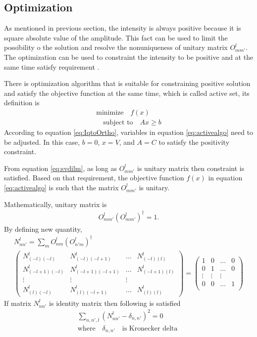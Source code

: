 \subsection{Optimization}
As mentioned in previous section, the intensity is always positive because it is square absolute value of the amplitude. This fact can be used to limit the possibility o the solution and resolve the nonuniqueness of unitary matrix $O^{l}_{mm'}$. The optimization can be used to constraint the intensity to be positive and at the same time satisfy requirement \Blq. 

There is optimization algorithm that is suitable for constraining positive solution and satisfy the objective function at the same time, which is called active set, its definition is
\begin{eqnarray}
\mbox{minimize}\quad f(x) \\ \nonumber
\quad \mbox{subject to} \quad Ax\geq b
\label{eq:activealgo}
\end{eqnarray}
According to equation \ref{eq:IqtoOrtho}, variables in equation \ref{eq:activealgo} need to be adjusted. In this case, $b=0$, $x=V$, and $A=C$ to satisfy the positivity constraint. 

From equation \ref{eq:svdilm}, as long as $O^{l}_{mm'}$ is unitary matrix then \Blq constraint is satisfied. Based on that requirement, the objective function $f(x)$ in equation \ref{eq:activealgo} is such that the matrix $O^{l}_{mm'}$ is unitary.  

Mathematically, unitary matrix is
\begin{eqnarray}
O^{l}_{mm'} (O^{l}_{mm'})^{\dagger} = 1. 
\end{eqnarray}
By defining new quantity,
\begin{eqnarray}
N^{l}_{nn'}=\sum_{m} O^{l}_{nm} (O^{l}_{n'm})^{\dagger} \\ \nonumber
\label{eq:NOmatrix}
\begin{pmatrix}
N^{l}_{(-l)(-l)}&N^{l}_{(-l)(-l+1)}&\dots&N^{l}_{(-l)(l)} \\
N^{l}_{(-l+1)(-l)}&N^{l}_{(-l+1)(-l+1)}&\dots&N^{l}_{(-l+1)(l)} \\
\vdots&\vdots&\vdots&  \\
N^{l}_{(l)(-l)}&N^{l}_{(l)(-l+1)}&\dots&N^{l}_{(l)(l)}
\end{pmatrix}
=
\begin{pmatrix}
1&0&\dots&0 \\
0&1&\dots&0 \\
\vdots&\vdots&\vdots&  \\
0&0&\dots&1 \\
\end{pmatrix}
\end{eqnarray}
If matrix $N^{l}_{nn'}$ is identity matrix then following is satisfied
\begin{eqnarray}
\sum_{n,n',l}(N^{l}_{nn'}-\delta_{n,n'})^2=0 \\
\mbox{where} \quad \delta_{n,n'} \quad \mbox{is Kronecker delta } \nonumber
\label{eq:objfunN}
\end{eqnarray}

